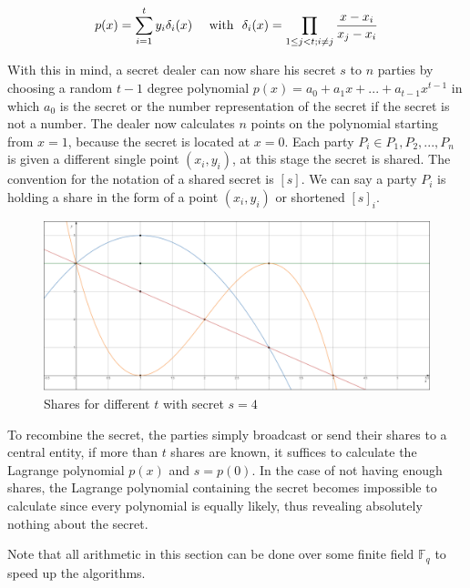\begin{equation} \label{eq:5}
\begin{aligned}
  p(x)= \sum_{i=1}^{t}y_{i}\delta_{i}(x)\text{\space\space\space\space with\space\space }\delta_{i}(x)=\prod_{1\leq j<t; i\neq j} \frac{x-x_i}{x_j-x_i}
\end{aligned}
\end{equation}

With this in mind, a secret dealer can now share his secret $s$ to $n$ parties by choosing a random $t-1$ degree polynomial $p(x)=a_{0} + a_{1}x + ... + a_{t-1}x^{t-1}$ in which $a_{0}$ is the secret or the number representation of the secret if the secret is not a number. The dealer now calculates $n$ points on the polynomial starting from $x=1$, because the secret is located at $x=0$. Each party $P_i \in {P_1, P_2, ..., P_n}$ is given a different single point $(x_i,y_i)$, at this stage the secret is shared. The convention for the notation of a shared secret is $[s]$. We can say a party $P_i$ is holding a share in the form of a point $(x_i,y_i)$ or shortened $[s]_i$.


\begin{figure}
  \includegraphics[width=\linewidth]{plots/secretsharing_big.png}
  \caption{Shares for different $t$ with secret $s=4$}
  \label{fig:secretsharing}
\end{figure}

To recombine the secret, the parties simply broadcast or send their shares to a central entity, if more than $t$ shares are known, it suffices to calculate the Lagrange polynomial $p(x)$ and $s=p(0)$. In the case of not having enough shares, the Lagrange polynomial containing the secret becomes impossible to calculate since every polynomial is equally likely, thus revealing absolutely nothing about the secret.

Note that all arithmetic in this section can be done over some finite field $\mathbb{F}_q$ to speed up the algorithms.

